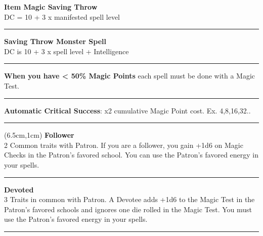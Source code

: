\documentclass[a4paper,12 pt,openany]{book}
\newcommand{\linex}{\rule{\textwidth}{0.4pt}}
\begin{document}
\begin{textblock*}{5cm}
\textbf{Item Magic Saving Throw}\\
DC = 10 + 3 x manifested spell level

\linex

\textbf{Saving Throw Monster Spell}\\
DC is 10 + 3 x spell level + Intelligence

\linex

\textbf{When you have < 50\% Magic Points} each spell must be done with a Magic Test.

\linex

\textbf{Automatic Critical Success}: x2 cumulative Magic Point cost. Ex. 4,8,16,32..

\linex

\end{textblock*}


\begin{textblock*}{13.5cm}(6.5cm,1cm) %
\textbf{Follower}\\
2 Common traits with Patron. If you are a follower, you gain +1d6 on Magic Checks in the Patron's favored school. You can use the Patron's favored energy in your spells.\\

\linex

\textbf{Devoted}\\
3 Traits in common with Patron. A Devotee adds +1d6 to the Magic Test in the Patron's favored schools and ignores one die rolled in the Magic Test. You must use the Patron's favored energy in your spells.

\linex


\end{textblock*}
\end{document}
